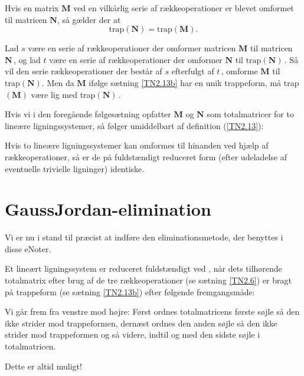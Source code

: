 \begin{corollary}\label{TN2.13f}
Hvis en matrix $\mathbf M$ ved en vilkårlig serie af rækkeoperationer er blevet omformet til matricen $\mathbf N$, så gælder der at
\begin{equation}
\mathrm{trap}(\mathbf N)=\mathrm{trap}(\mathbf M).
\end{equation}
\end{corollary}

\begin{bevis}
Lad $s$ være en serie af rækkeoperationer der omformer matricen $\mathbf M$ til matricen $\mathbf N\,$, og lad $t$ være en serie af rækkeoperationer der omformer $\mathbf N$ til $\mathrm{trap}(\mathbf N)\,$. Så vil den serie rækkeoperationer der består af $s$ efterfulgt af $t\,$, omforme $\mathbf M$ til $\mathrm{trap}(\mathbf N)$. Men da $\mathbf M$ ifølge sætning \ref{TN2.13b} har en unik trappeform, må trap$(\mathbf M)$ være lig med trap$(\mathbf N)\,$.
\end{bevis}

Hvis vi i den foregående følgesætning opfatter $\mathbf M$ og $\mathbf N$ som totalmatricer for to lineære ligningssystemer, så følger umiddelbart 
af definition (\ref{TN2.13}):

\begin{corollary}\label{TN2.13d}
Hvis to lineære ligningssystemer kan omformes til hinanden ved hjælp af rækkeoperationer, så er de på fuldstændigt reduceret form (efter udeladelse af eventuelle trivielle ligninger) identiske.
\end{corollary}

\section{GaussJordan-elimination}\label{TN2.13e}

Vi er nu i stand til præcist at indføre den eliminationsmetode, der benyttes i disse eNoter. 

\begin{definition}\label{TN2.13c}
Et lineært ligningssystem er reduceret fuldstændigt ved , når dets tilhørende totalmatrix efter brug af de tre rækkeoperationer (se sætning \ref{TN2.6}) er bragt på trappeform (se sætning \ref{TN2.13b}) efter følgende fremgangsmåde:

\begin{think}
Vi går frem fra venstre mod højre: Først ordnes totalmatricens første søjle så den ikke strider mod trappeformen, dernæst ordnes den anden søjle så den ikke strider mod trappeformen og så videre, indtil og med den sidste søjle i totalmatricen.
\end{think}

Dette er altid muligt!
\end{definition}

